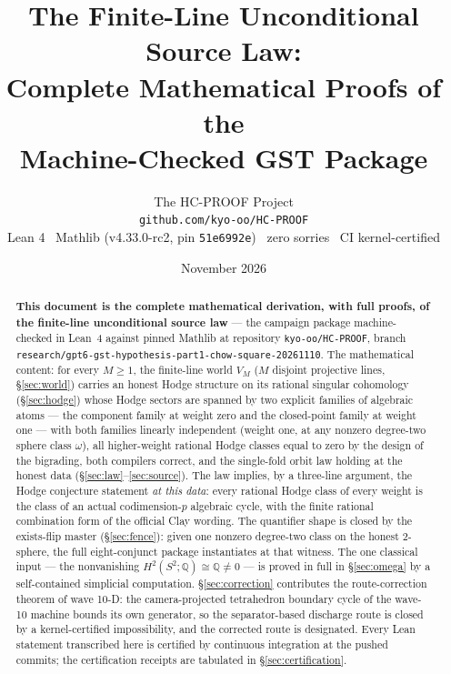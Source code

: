 \documentclass[11pt,a4paper]{article}
\title{\textbf{The Finite-Line Unconditional Source Law:\\
Complete Mathematical Proofs of the\\
Machine-Checked GST Package}}
\author{The HC-PROOF Project\\
\small\texttt{github.com/kyo-oo/HC-PROOF}\\
\small Lean 4 \textbullet\ Mathlib (v4.33.0-rc2, pin \texttt{51e6992e}) \textbullet\ zero sorries \textbullet\ CI kernel-certified}
\date{November 2026}
\theoremstyle{plain}
\theoremstyle{definition}
\newcommand{\Q}{\mathbb{Q}}
\begin{document}
\maketitle

\begin{abstract}
\textbf{This document is the complete mathematical derivation, with full
proofs, of the finite-line unconditional source law} --- the campaign
package machine-checked in Lean~4 against pinned Mathlib at repository
\texttt{kyo-oo/HC-PROOF}, branch
\texttt{research/gpt6-gst-hypothesis-part1-chow-square-20261110}.  The
mathematical content: for every $M \ge 1$, the finite-line world $V_M$
($M$ disjoint projective lines, \S\ref{sec:world}) carries an honest
Hodge structure on its rational singular cohomology (\S\ref{sec:hodge})
whose Hodge sectors are spanned by two explicit families of algebraic
atoms --- the component family at weight zero and the closed-point family
at weight one --- with both families linearly independent (weight one,
at any nonzero degree-two sphere class $\omega$), all higher-weight
rational Hodge classes equal to zero by the design of the bigrading, both
compilers correct, and the single-fold orbit law holding at the honest
data (\S\ref{sec:law}--\ref{sec:source}).  The law implies, by a
three-line argument, the Hodge conjecture statement \emph{at this data}:
every rational Hodge class of every weight is the class of an actual
codimension-$p$ algebraic cycle, with the finite rational combination
form of the official Clay wording.  The quantifier shape is closed by the
exists-flip master (\S\ref{sec:fence}): given one nonzero degree-two
class on the honest $2$-sphere, the full eight-conjunct package
instantiates at that witness.  The one classical input --- the
nonvanishing $H^2(S^2;\Q) \cong \Q \ne 0$ --- is proved in full in
\S\ref{sec:omega} by a self-contained simplicial computation.  \S\ref{sec:correction}
contributes the route-correction theorem of wave 10-D: the
camera-projected tetrahedron boundary cycle of the wave-10 machine bounds
its own generator, so the separator-based discharge route is closed by a
kernel-certified impossibility, and the corrected route is designated.
Every Lean statement transcribed here is certified by continuous
integration at the pushed commits; the certification receipts are
tabulated in \S\ref{sec:certification}.
\end{abstract}

\tableofcontents

\end{document}
